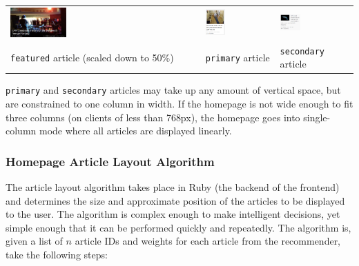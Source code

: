 \documentclass[11pt,letterpaper,titlepage]{article}
\begin{document}
\begin{tabular}{ m{} m{} m{} }
\includegraphics[width=0.3\textwidth]{img/featured-image.png} &
\includegraphics[width=0.3\textwidth]{img/primary-image.png} &
\includegraphics[width=0.3\textwidth]{img/secondary-image.png} \\
\centering\verb+featured+ article (scaled down to 50\%) & \centering\verb+primary+ article & \centering\verb+secondary+ article
\end{tabular}
\vspace{1.2em}

\verb+primary+ and \verb+secondary+ articles may take up any amount of vertical space, but are constrained to one column in width.
If the homepage is not wide enough to fit three columns (on clients of less than 768px), the homepage goes into single-column mode where all articles are displayed linearly.

\subsubsection{Homepage Article Layout Algorithm}
The article layout algorithm takes place in Ruby (the backend of the frontend) and determines the size and approximate position of the articles to be displayed to the user.
The algorithm is complex enough to make intelligent decisions, yet simple enough that it can be performed quickly and repeatedly.
The algorithm is, given a list of $n$ article IDs and weights for each article from the recommender, take the following steps:
\end{document}
